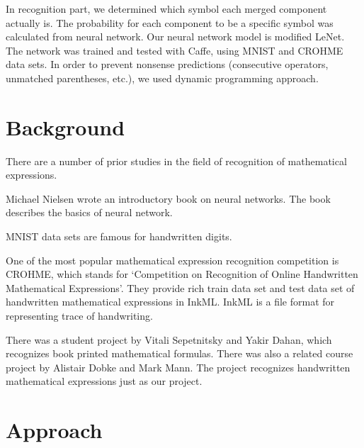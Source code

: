 \documentclass[10pt,twocolumn,letterpaper]{article}
\begin{document}
In recognition part, we determined which symbol each merged component actually is.
The probability for each component to be a specific symbol was calculated from neural network.
Our neural network model is modified LeNet\cite{LeNet}.
The network was trained and tested with Caffe, using MNIST\cite{MNIST} and CROHME\cite{CROHME} data sets.
In order to prevent nonsense predictions (consecutive operators, unmatched parentheses, etc.), we used dynamic programming approach.


\section{Background}

There are a number of prior studies in the field of recognition of mathematical expressions.

Michael Nielsen\cite{MichaelNielsen} wrote an introductory book on neural networks.
The book describes the basics of neural network.

MNIST\cite{MNIST} data sets are famous for handwritten digits.

One of the most popular mathematical expression recognition competition is CROHME,
which stands for
`Competition on Recognition of Online Handwritten Mathematical Expressions'\cite{CROHME}.
They provide rich train data set and test data set of handwritten mathematical expressions
in InkML. InkML is a file format for representing trace of handwriting.


There was a student project by Vitali Sepetnitsky and Yakir Dahan\cite{OCRMATH}, which recognizes book printed mathematical formulas.
There was also a related course project by Alistair Dobke and Mark Mann\cite{OCRMATH2}. The project recognizes handwritten mathematical expressions just as our project.



\section{Approach}
\end{document}
